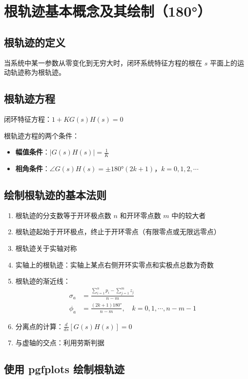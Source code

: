 \section{根轨迹基本概念及其绘制（180°）}

\subsection{根轨迹的定义}
当系统中某一参数从零变化到无穷大时，闭环系统特征方程的根在 $s$ 平面上的运动轨迹称为根轨迹。

\subsection{根轨迹方程}
闭环特征方程：$1 + KG(s)H(s) = 0$

根轨迹方程的两个条件：
\begin{itemize}
    \item \textbf{幅值条件}：$|G(s)H(s)| = \frac{1}{K}$
    \item \textbf{相角条件}：$\angle G(s)H(s) = \pm 180°(2k+1)$，$k = 0, 1, 2, \cdots$
\end{itemize}

\subsection{绘制根轨迹的基本法则}
\begin{enumerate}
    \item 根轨迹的分支数等于开环极点数 $n$ 和开环零点数 $m$ 中的较大者
    \item 根轨迹起始于开环极点，终止于开环零点（有限零点或无限远零点）
    \item 根轨迹关于实轴对称
    \item 实轴上的根轨迹：实轴上某点右侧开环实零点和实极点总数为奇数
    \item 根轨迹的渐近线：
    \begin{align}
    \sigma_a &= \frac{\sum_{i=1}^n p_i - \sum_{j=1}^m z_j}{n-m} \\
    \phi_a &= \frac{(2k+1)180°}{n-m}, \quad k = 0, 1, \cdots, n-m-1
    \end{align}
    \item 分离点的计算：$\frac{d}{ds}[G(s)H(s)] = 0$
    \item 与虚轴的交点：利用劳斯判据
\end{enumerate}

\subsection{使用 pgfplots 绘制根轨迹}

